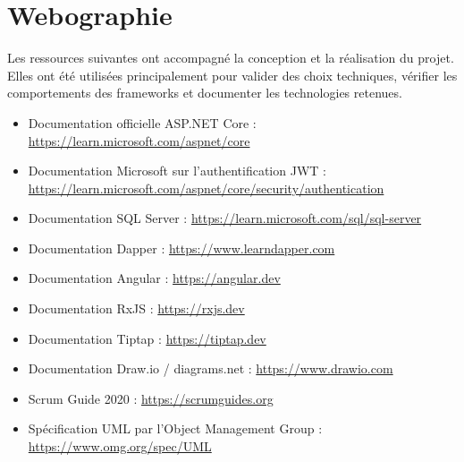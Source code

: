 \chapter{Webographie}

Les ressources suivantes ont accompagné la conception et la réalisation du projet. Elles ont été utilisées principalement pour valider des choix techniques, vérifier les comportements des frameworks et documenter les technologies retenues.

\begin{itemize}
    \item Documentation officielle ASP.NET Core : \url{https://learn.microsoft.com/aspnet/core}
    \item Documentation Microsoft sur l'authentification JWT : \url{https://learn.microsoft.com/aspnet/core/security/authentication}
    \item Documentation SQL Server : \url{https://learn.microsoft.com/sql/sql-server}
    \item Documentation Dapper : \url{https://www.learndapper.com}
    \item Documentation Angular : \url{https://angular.dev}
    \item Documentation RxJS : \url{https://rxjs.dev}
    \item Documentation Tiptap : \url{https://tiptap.dev}
    \item Documentation Draw.io / diagrams.net : \url{https://www.drawio.com}
    \item Scrum Guide 2020 : \url{https://scrumguides.org}
    \item Spécification UML par l'Object Management Group : \url{https://www.omg.org/spec/UML}
\end{itemize}
